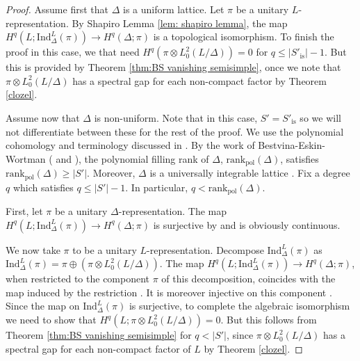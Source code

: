 \documentclass[12pt,reqno]{amsart}
\theoremstyle{definition}
\newcommand{\abs}[1]{\left| #1 \right|}
\begin{document}
\begin{proof}
    Assume first that $\Delta$ is a uniform lattice. Let $\pi$ be a unitary $L$-representation. By Shapiro Lemma \ref{lem: shapiro lemma}, the map $H^q(L;\mathrm{Ind}_\Delta^L(\pi)) \to H^q(\Delta;\pi)$ is a topological isomorphism. To finish the proof in this case, we that need $H^q(\pi \otimes L^2_0(L / \Delta))=0$ for $q \leq \abs{S'_\mathrm{is}}-1$. But this is provided by Theorem \ref{thm:BS vanishing semisimple}, once we note that $\pi \otimes L^2_0(L / \Delta)$ has a spectral gap for each non-compact factor by Theorem \ref{clozel}.
    
    Assume now that $\Delta$ is non-uniform. Note that in this case, $S'=S'_\mathrm{is}$ so we will not differentiate between these for the rest of the proof. We use the polynomial cohomology and terminology discussed in \cite[\S6]{BaderSauer}. By the work of Bestvina-Eskin-Wortman (\cite[Corollary~5]{BEW13} and \cite[Theorem~6.11]{BaderSauer}), the polynomial filling rank of $\Delta$, $\mathrm{rank}_{\mathrm{pol}}(\Delta)$, satisfies $\mathrm{rank}_{\mathrm{pol}}(\Delta) \geq \abs{S'}$. Moreover, $\Delta$ is a universally integrable lattice \cite[Proposition~6.19]{BaderSauer}. Fix a degree $q$ which satisfies $q \leq \abs{S'}-1$. In particular, $q < \mathrm{rank}_{\mathrm{pol}}(\Delta)$.
    
    First, let $\pi$ be a unitary $\Delta$-representation. The map $H^q(L;\mathrm{Ind}_\Delta^L(\pi)) \to H^q(\Delta;\pi)$ is surjective by \cite[Theorem~6.23]{BaderSauer} and is obviously continuous.
    
    We now take $\pi$ to be a unitary $L$-representation. Decompose $\mathrm{Ind}_\Delta^L(\pi)$ as $\mathrm{Ind}_\Delta^L(\pi)=\pi \oplus (\pi \otimes L^2_0(L /\Delta))$. The map $H^q(L;\mathrm{Ind}_\Delta^L(\pi)) \to H^q(\Delta;\pi)$, when restricted to the component $\pi$ of this decomposition, coincides with the map induced by the restriction \cite[Theorem~6.26]{BaderSauer}. It is moreover injective on this component \cite[Theorem~6.26]{BaderSauer}. Since the map on $\mathrm{Ind}_\Delta^L(\pi)$ is surjective, to complete the algebraic isomorphism we need to show that $H^q(L;\pi \otimes L^2_0(L/\Delta))=0$. But this follows from Theorem \ref{thm:BS vanishing semisimple} for $q<|S'|$, since $\pi \otimes L^2_0(L/\Delta)$ has a spectral gap for each non-compact factor of $L$ by Theorem \ref{clozel}.


\end{proof}
\end{document}
